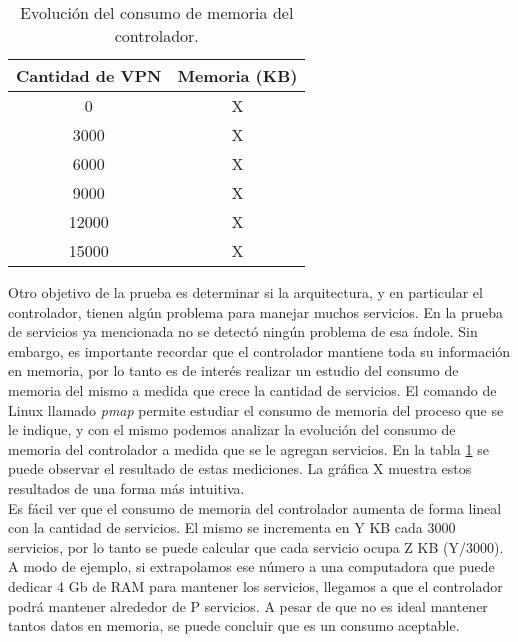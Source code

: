 
\begin{table}[ht]
	\caption{Evolución del consumo de memoria del controlador.}
	\centering 
	\begin{tabular}{c c}
		\hline\hline
		Cantidad de VPN & Memoria (KB) \\ [0.5ex]
		\hline
		0 & X \\
		3000 & X \\
		6000 & X \\
		9000 & X \\
		12000 & X \\
		15000 & X \\ [1ex]
		\hline
	\end{tabular}
	\label{table:consumo_de_memoria}
\end{table}

Otro objetivo de la prueba es determinar si la arquitectura, y en particular el controlador, tienen algún problema para manejar muchos servicios. En la prueba de servicios ya mencionada no se detectó ningún problema de esa índole. Sin embargo, es importante recordar que el controlador mantiene toda su información en memoria, por lo tanto es de interés realizar un estudio del consumo de memoria del mismo a medida que crece la cantidad de servicios. El comando de Linux llamado \textit{pmap} permite estudiar el consumo de memoria del proceso que se le indique, y con el mismo podemos analizar la evolución del consumo de memoria del controlador a medida que se le agregan servicios. En la tabla \ref{table:consumo_de_memoria} se puede observar el resultado de estas mediciones. La gráfica X muestra estos resultados de una forma más intuitiva.\\
Es fácil ver que el consumo de memoria del controlador aumenta de forma lineal con la cantidad de servicios. El mismo se incrementa en Y KB cada 3000 servicios, por lo tanto se puede calcular que cada servicio ocupa Z KB (Y/3000). A modo de ejemplo, si extrapolamos ese número a una computadora que puede dedicar 4 Gb de RAM para mantener los servicios, llegamos a que el controlador podrá mantener alrededor de P servicios. A pesar de que no es ideal mantener tantos datos en memoria, se puede concluir que es un consumo aceptable. \\

